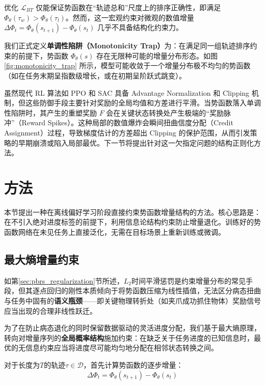 优化 $\mathcal{L}_{BT}$ 仅能保证势函数在“轨迹总和”尺度上的排序正确性，即满足 $\Phi_\theta(\tau_w) > \Phi_\theta(\tau_l)$。然而，这一宏观约束对微观的数值增量 $\Delta \Phi_t = \Phi_\theta(s_{t+1}) - \Phi_\theta(s_t)$ 几乎不具备结构化约束力。

我们正式定义\textbf{单调性陷阱（Monotonicity Trap）}为：在满足同一组轨迹排序约束的前提下，势函数 $\Phi_\theta(s)$ 存在无限种可能的增量分布形态。如图 \ref{fig:monotonicity_trap} 所示，模型可能收敛于一个增量分布极不均匀的势函数（如在任务末期呈指数级增长，或在初期呈阶跃式跳变）。

虽然现代 RL 算法如 PPO \cite{schulman2017} 和 SAC \cite{haarnoja2018} 具备 Advantage Normalization 和 Clipping 机制，但这些防御手段主要针对奖励的全局均值和方差进行平滑。当势函数落入单调性陷阱时，其产生的重塑奖励 $F$ 会在关键状态转换处产生极端的“奖励脉冲”（Reward Spikes）。这种局部的数值爆炸会瞬间扭曲信度分配（Credit Assignment）过程，导致梯度估计的方差超出 Clipping 的保护范围，从而引发策略的早期崩溃或陷入局部最优。下一节将提出针对这一欠指定问题的结构正则化方法。

\section{方法}

本节提出一种在离线偏好学习阶段直接约束势函数增量结构的方法。核心思路是：在不引入绝对进度标签的前提下，利用信息论结构约束防止增量退化。训练好的势函数网络在未见任务上直接泛化，无需在目标场景上重新训练或微调。

\subsection{最大熵增量约束}

如第\ref{sec:pbrs_regularization}节所述，$L_2$时间平滑惩罚是约束增量分布的常见手段，但其逐点回归的刚性本质倾向于将势函数压缩为线性插值，无法区分病态扭曲与任务中固有的\textbf{语义瓶颈}——即关键物理转折处（如夹爪成功抓住物体）奖励信号应当出现的合理非线性跃迁。

为了在防止病态退化的同时保留数据驱动的灵活进度分配，我们基于最大熵原理\cite{shannon1948,jaynes1957}，转向对增量序列的\textbf{全局概率结构}施加约束：在缺乏关于任务进度的已知信息时，最优的无信息约束应当将进度尽可能均匀地分配在相邻状态转换之间。

对于长度为$T$的轨迹$\tau \in \mathcal{D}$，首先计算势函数的逐步增量：
\begin{equation}
\label{eq:delta_phi}
    \Delta\Phi_t = \Phi_\theta(s_{t+1}) - \Phi_\theta(s_t)
\end{equation}

